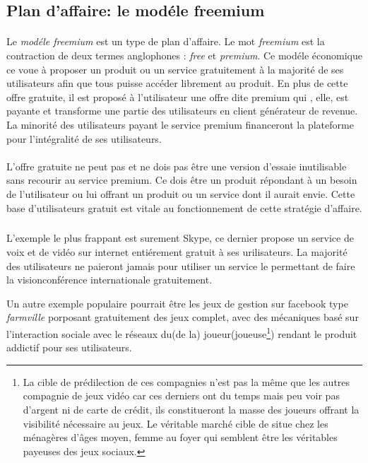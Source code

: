 \documentclass[11pt, a4paper ]{article}
\begin{document}
\begin{spacing}{1.5}
			\subsection{Plan d'affaire: le modéle freemium} %

\paragraph{}
Le \emph{modéle freemium} est un type de plan d'affaire. Le mot \emph{freemium} est la contraction de deux termes anglophones : \emph{free} et \emph{premium}. Ce modéle économique ce voue à proposer un produit ou un service gratuitement à la majorité de ses utilisateurs afin que tous puisse accéder librement au produit. En plus de cette offre gratuite, il est proposé à l'utilisateur une offre dite premium qui , elle, est payante et transforme une partie des utilisateurs en client générateur de revenue. La minorité des utilisateurs payant le service premium financeront la plateforme pour l'intégralité de ses utilisateurs.


\paragraph{} %
L'offre gratuite ne peut pas et ne dois pas être une version d'essaie inutilisable sans recourir au service premium. Ce dois être un produit répondant à un besoin de l'utilisateur ou lui offrant un produit ou un service dont il aurait envie. Cette base d'utilisateurs gratuit est vitale au fonctionnement de cette stratégie d'affaire.

\subparagraph{} %
L'exemple le plus frappant est surement Skype, ce dernier propose un service de voix et de vidéo sur internet entiérement gratuit à ses urilisateurs. La majorité des utilisateurs ne paieront jamais pour utiliser un service le permettant de faire la visionconférence internationale gratuitement.

Un autre exemple populaire pourrait être les jeux de gestion sur facebook type \emph{farmville} porposant gratuitement des jeux complet, avec des mécaniques basé sur l'interaction sociale avec le réseaux du(de la) joueur(joueuse\footnote{La cible de prédilection de ces compagnies n'est pas la même que les autres compagnie de jeux vidéo car ces derniers ont du temps mais peu voir pas d'argent ni de carte de crédit, ils constitueront la masse des joueurs offrant la visibilité nécessaire au jeux. Le véritable marché cible de situe chez les ménagères d'âges moyen, femme au foyer qui semblent être les véritables payeuses des jeux sociaux. }) rendant le produit addictif pour ses utilisateurs.


\end{spacing}
\end{document}

